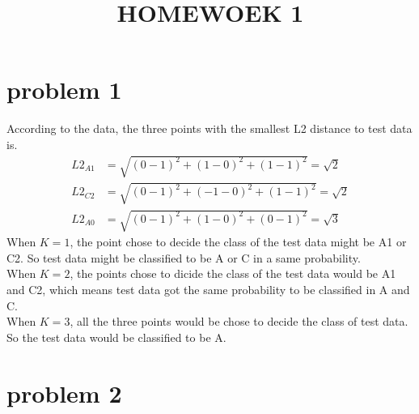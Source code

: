 \documentclass[conference]{IEEEtran}
\begin{document}
\title{HOMEWOEK 1}

\author{
}

\maketitle

\section*{problem 1}
According to the data, the three points with the smallest L2 distance to test data is.
\[\begin{aligned}
    L2_{A1}&=\sqrt{(0-1)^2+(1-0)^2+(1-1)^2}=\sqrt{2}\\
    L2_{C2}&=\sqrt{(0-1)^2+(-1-0)^2+(1-1)^2}=\sqrt{2}\\
    L2_{A0}&=\sqrt{(0-1)^2+(1-0)^2+(0-1)^2}=\sqrt{3}
\end{aligned}\]
When $K=1$, the point chose to decide the class of the test data might be A1 or C2. So 
test data might be classified to be A or C in a same probability. \\
When $K=2$, the points chose to dicide the class of the test data would be A1 and C2,
which means test data got the same probability to be classified in A and C.\\
When $K=3$, all the three points would be chose to decide the class of test data. So the
test data would be classified to be A.

\section*{problem 2}
\end{document}

